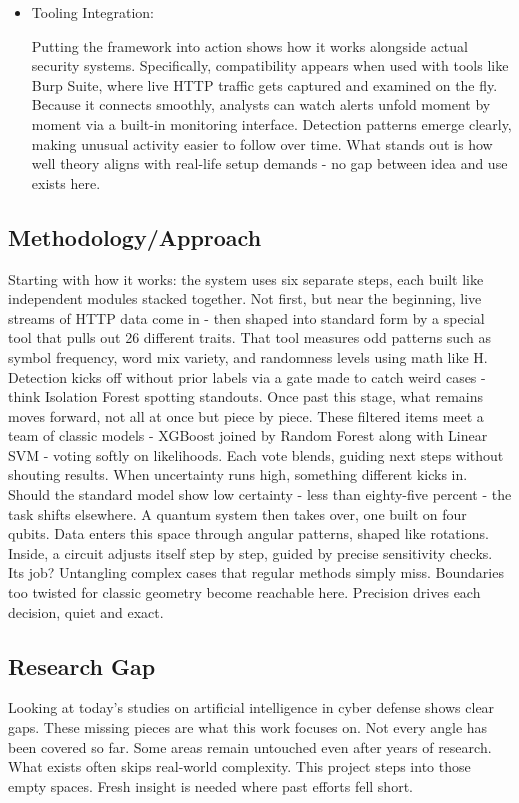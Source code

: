 \documentclass[journal,onecolumn]{IEEEtran}
\begin{document}
\begin{itemize}
\item Tooling Integration:

Putting the framework into action shows how it works alongside actual security systems. Specifically, compatibility appears when used with tools like Burp Suite, where live HTTP traffic gets captured and examined on the fly. Because it connects smoothly, analysts can watch alerts unfold moment by moment via a built-in monitoring interface. Detection patterns emerge clearly, making unusual activity easier to follow over time. What stands out is how well theory aligns with real-life setup demands - no gap between idea and use exists here.
\end{itemize}

\subsection{Methodology/Approach}
Starting with how it works: the system uses six separate steps, each built like independent modules stacked together. Not first, but near the beginning, live streams of HTTP data come in - then shaped into standard form by a special tool that pulls out 26 different traits. That tool measures odd patterns such as symbol frequency, word mix variety, and randomness levels using math like H. Detection kicks off without prior labels via a gate made to catch weird cases - think Isolation Forest spotting standouts. Once past this stage, what remains moves forward, not all at once but piece by piece. These filtered items meet a team of classic models - XGBoost joined by Random Forest along with Linear SVM - voting softly on likelihoods. Each vote blends, guiding next steps without shouting results. When uncertainty runs high, something different kicks in. Should the standard model show low certainty - less than eighty-five percent - the task shifts elsewhere. A quantum system then takes over, one built on four qubits. Data enters this space through angular patterns, shaped like rotations. Inside, a circuit adjusts itself step by step, guided by precise sensitivity checks. Its job? Untangling complex cases that regular methods simply miss. Boundaries too twisted for classic geometry become reachable here. Precision drives each decision, quiet and exact.

\subsection{Research Gap}
Looking at today's studies on artificial intelligence in cyber defense shows clear gaps. These missing pieces are what this work focuses on. Not every angle has been covered so far. Some areas remain untouched even after years of research. What exists often skips real-world complexity. This project steps into those empty spaces. Fresh insight is needed where past efforts fell short.
\end{document}
